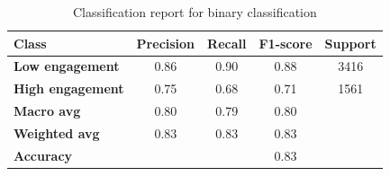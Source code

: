 \begin{table}[H]
    \centering
    \begin{tabular}{lcccc}
        \toprule
        \bf{Class} & \bf{Precision} & \bf{Recall} & \bf{F1-score} & \bf{Support} \\
        \midrule
        \bf{Low engagement} & 0.86 & 0.90 & 0.88 & 3416 \\
        \bf{High engagement} & 0.75 & 0.68 & 0.71 & 1561 \\
        \midrule
        \bf{Macro avg} & 0.80 & 0.79 & 0.80 & \\
        \bf{Weighted avg} & 0.83 & 0.83 & 0.83 & \\
        \midrule
        \bf{Accuracy}  &  &  & 0.83 & \\
        \bottomrule
    \end{tabular}
    \caption{Classification report for binary classification}
    \label{tab:binary_classification_report}
\end{table}


